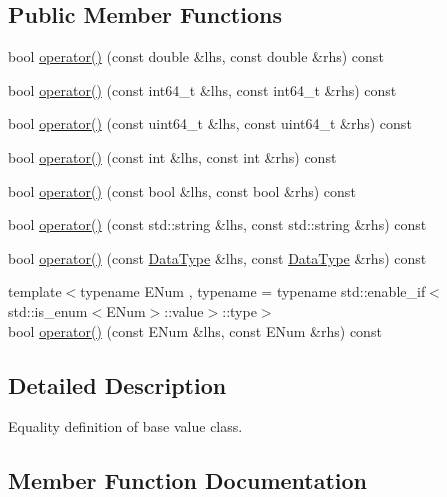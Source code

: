 \subsection*{Public Member Functions}
\begin{DoxyCompactItemize}
\item 
bool \hyperlink{classtvm_1_1BaseValueEqual_a5bcd390efea36f5ea22ea88c2b49d0e4}{operator()} (const double \&lhs, const double \&rhs) const 
\item 
bool \hyperlink{classtvm_1_1BaseValueEqual_a64a27662996232361171c0b83ef64efc}{operator()} (const int64\+\_\+t \&lhs, const int64\+\_\+t \&rhs) const 
\item 
bool \hyperlink{classtvm_1_1BaseValueEqual_aa073e7b407abe9736f3dfc82b1d17dfe}{operator()} (const uint64\+\_\+t \&lhs, const uint64\+\_\+t \&rhs) const 
\item 
bool \hyperlink{classtvm_1_1BaseValueEqual_a2d2542641197aa4f5d6e00dd826c41fa}{operator()} (const int \&lhs, const int \&rhs) const 
\item 
bool \hyperlink{classtvm_1_1BaseValueEqual_ad3272aa40535658ca5dd8658e392ba91}{operator()} (const bool \&lhs, const bool \&rhs) const 
\item 
bool \hyperlink{classtvm_1_1BaseValueEqual_a70b32b6f7a8c60f754ed8dd945030bbb}{operator()} (const std\+::string \&lhs, const std\+::string \&rhs) const 
\item 
bool \hyperlink{classtvm_1_1BaseValueEqual_a76b682e3ea647fae4e0da9651674417a}{operator()} (const \hyperlink{namespacetvm_a41918af1a1dc386388639a9d3ad06c5d}{Data\+Type} \&lhs, const \hyperlink{namespacetvm_a41918af1a1dc386388639a9d3ad06c5d}{Data\+Type} \&rhs) const 
\item 
{\footnotesize template$<$typename E\+Num , typename  = typename std\+::enable\+\_\+if$<$std\+::is\+\_\+enum$<$\+E\+Num$>$\+::value$>$\+::type$>$ }\\bool \hyperlink{classtvm_1_1BaseValueEqual_a384fdf8cfd26188b4ec6febae8e698df}{operator()} (const E\+Num \&lhs, const E\+Num \&rhs) const 
\end{DoxyCompactItemize}


\subsection{Detailed Description}
Equality definition of base value class. 

\subsection{Member Function Documentation}
